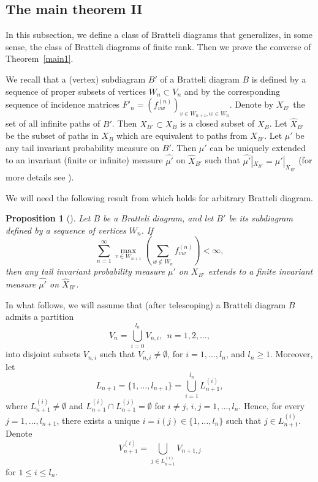 \documentclass[11pt, english, reqno]{amsart}
\theoremstyle{definition}
\theoremstyle{remark}
\theoremstyle{plain}
\newtheorem{prop}[defin]{Proposition}
\def\wh{\widehat}
\numberwithin{equation}{section}
\begin{document}
{\subsection{The main theorem II}\label{main_thm_inverse}
In this subsection, we define a class of Bratteli diagrams that  generalizes,
in some sense,  the class of Bratteli diagrams of finite rank. Then we prove
 the converse of Theorem~\ref{main1}.

We recall that a (vertex) subdiagram $B'$ of a Bratteli diagram $B$ is defined
 by a sequence of proper subsets of vertices $W_n \subset V_n$ and by the
 corresponding sequence of incidence matrices $F'_n =
 (f_{vw}^{(n)})_{v \in W_{n+1}, w \in W_n}$. Denote by $X_{B'}$ the set
of all infinite paths of $B'$. Then $X_{B'} \subset X_B$ is a closed subset of
 $X_B$. Let $\wh X_{B'}$ be the subset of paths in $X_B$ which are
equivalent to  paths from $X_{B'}$. Let $\mu'$ be any tail invariant
 probability measure on $B'$. Then $\mu'$ can be uniquely extended to an
  invariant (finite or infinite) measure
$\wh{\mu'}$ on $\wh X_{B'}$ such that $\wh{\mu'}|_{X_{B'}} =
{\mu'}|_{X_{B'}}$ (for more details see
\cite{AdamskaBezuglyiKarpelKwiatkowski2016}).

We will need the following  result from
 \cite[Theorem 2.2]{AdamskaBezuglyiKarpelKwiatkowski2016}
 which holds for arbitrary Bratteli diagram.

\begin{prop}[\cite{AdamskaBezuglyiKarpelKwiatkowski2016}]\label{1.6b}
Let $B$ be a Bratteli diagram, and let $B'$ be its subdiagram defined by a
 sequence of vertices $W_n$.
If
$$
\sum_{n=1}^\infty \max_{v \in W_{n+1}} \left(\sum_{w \notin W_n} f_{vw}^{(n)}\right) < \infty,
$$
then any tail invariant probability measure $\mu'$ on $X_{B'}$ extends to
a finite invariant measure $\wh {\mu'}$ on $\wh X_{B'}$.
\end{prop}

In what follows, we will assume that (after telescoping) a Bratteli diagram
$B$ admits a  partition
$$
V_n = \bigcup_{i = 0}^{l_n}V_{n,i}, \ \ n = 1,2,\ldots,
$$
into disjoint subsets $V_{n,i}$ such that $V_{n,i} \neq \emptyset$, for
$i = 1,\ldots,l_{n}$, and $l_n \geq 1$. Moreover, let
$$
L_{n+1} = \{1,\ldots,l_{n+1}\} = \bigcup_{i = 1}^{l_n}L_{n+1}^{(i)},
$$
where $L_{n+1}^{(i)} \neq \emptyset$ and  $L_{n+1}^{(i)} \cap
 L_{n+1}^{(j)} = \emptyset$ for $i \neq j$, $i,j = 1,\ldots, l_n$. Hence,
  for every $j = 1, \ldots, l_{n+1}$, there exists a unique $i = i(j) \in
  \{1,\ldots, l_n\}$ such that $j \in L_{n+1}^{(i)}$. Denote
$$
V_{n+1}^{(i)} = \bigcup_{j \in L_{n+1}^{(i)}} V_{n+1,j}
$$
for $1 \leq i \leq l_n$.

}
\end{document}
